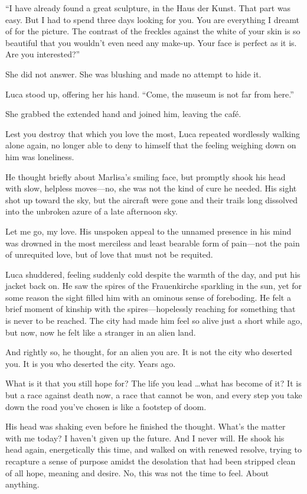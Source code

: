 ``I have already found a great sculpture, in the Haus der Kunst. That part was easy. But I had to spend three days looking for you. You are everything I dreamt of for the picture. The contrast of the freckles against the white of your skin is so beautiful that you wouldn't even need any make-up. Your face is perfect as it is. Are you interested?''

She did not answer. She was blushing and made no attempt to hide it.

Luca stood up, offering her his hand. ``Come, the museum is not far from here.''

She grabbed the extended hand and joined him, leaving the café.

\sectionline

Lest you destroy that which you love the most, Luca repeated wordlessly walking alone again, no longer able to deny to himself that the feeling weighing down on him was loneliness.

He thought briefly about Marlisa's smiling face, but promptly shook his head with slow, helpless moves---no, she was not the kind of cure he needed. His sight shot up toward the sky, but the aircraft were gone and their trails long dissolved into the unbroken azure of a late afternoon sky.

Let me go, my love. His unspoken appeal to the unnamed presence in his mind was drowned in the most merciless and least bearable form of pain---not the pain of unrequited love, but of love that must not be requited.

Luca shuddered, feeling suddenly cold despite the warmth of the day, and put his jacket back on. He saw the spires of the Frauenkirche sparkling in the sun, yet for some reason the sight filled him with an ominous sense of foreboding. He felt a brief moment of kinship with the spires---hopelessly reaching for something that is never to be reached. The city had made him feel so alive just a short while ago, but now, now he felt like a stranger in an alien land.

And rightly so, he thought, for an alien you are. It is not the city who deserted you. It is you who deserted the city. Years ago.

What is it that you still hope for? The life you lead \ldots what has become of it? It is but a race against death now, a race that cannot be won, and every step you take down the road you've chosen is like a footstep of doom.

His head was shaking even before he finished the thought. What's the matter with me today? I haven't given up the future. And I never will. He shook his head again, energetically this time, and walked on with renewed resolve, trying to recapture a sense of purpose amidst the desolation that had been stripped clean of all hope, meaning and desire. No, this was not the time to feel. About anything.

